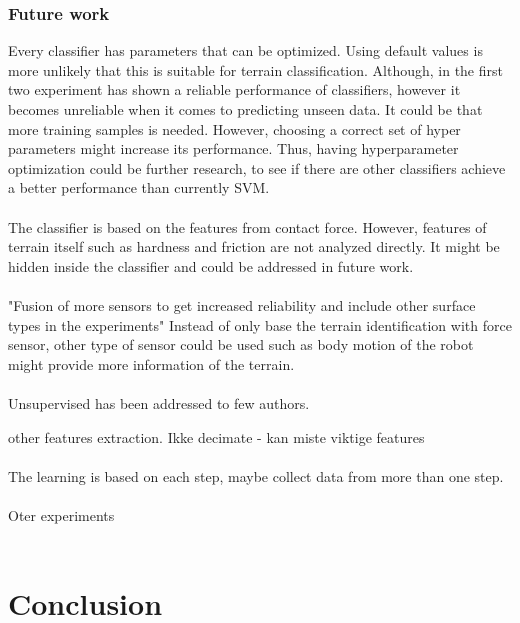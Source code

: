\documentclass[USenglish]{ifimaster}  %
\begin{document}
\subsection{Future work}
Every classifier has parameters that can be optimized. Using default values is more unlikely that this is suitable for terrain classification. Although, in the first two experiment has shown a reliable performance of classifiers, however it becomes unreliable when it comes to predicting unseen data. It could be that more training samples is needed. However, choosing a correct set of hyper parameters might increase its performance. Thus, having hyperparameter optimization could be further research, to see if there are other classifiers achieve a better performance than currently SVM.
\\
\\
The classifier is based on the features from contact force. However, features of terrain itself such as hardness and friction are not analyzed directly. It might be hidden inside the classifier and could be addressed in future work. 
\\
\\
"Fusion of more sensors to get increased reliability and include other surface types in the experiments"
Instead of only base the terrain identification with force sensor, other type of sensor could be used such as body motion of the robot might provide more information of the terrain.  
\\
\\
Unsupervised has been addressed to few authors.

other features extraction.
Ikke decimate - kan miste viktige features
\\
\\
The learning is based on each step, maybe collect data from more than one step.
\\
\\
Oter experiments
\\
\\





\chapter{Conclusion}


\backmatter{}


\end{document}
